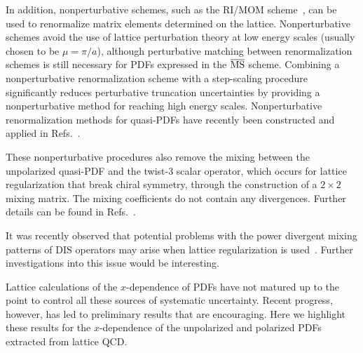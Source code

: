 \begin{itemize}
In addition, nonperturbative schemes, such as the 
RI/MOM scheme~\cite{Martinelli:1994ty}, 
can be used to renormalize matrix elements determined on the lattice. 
%
Nonperturbative schemes avoid the use of lattice perturbation theory at 
low energy scales (usually chosen to be $\mu = \pi/a$), although perturbative 
matching between renormalization schemes is still necessary for PDFs expressed 
in the $\overline{\rm MS}$ scheme. 
%
Combining a nonperturbative renormalization scheme with a step-scaling 
procedure~\cite{Luscher:1991wu} significantly reduces perturbative truncation 
uncertainties by providing a nonperturbative method for reaching high energy 
scales.
% 
Nonperturbative renormalization methods for quasi-PDFs have recently been 
constructed and applied in 
Refs.~\cite{Alexandrou:2017huk,Chen:2017mzz,Green:2017xeu}.

These nonperturbative procedures also remove the mixing between the unpolarized 
quasi-PDF and the twist-3 scalar operator, which occurs for lattice 
regularization that break chiral symmetry, through the construction 
of a $2\times2$ mixing matrix. 
%
The mixing coefficients do not contain any divergences. 
%
Further details can be found in Refs.~\cite{Alexandrou:2017huk,Chen:2017mzz}. 

It was recently observed that potential problems with the power divergent 
mixing patterns of DIS operators may arise when lattice regularization
is used~\cite{Rossi:2017muf}.
%
Further investigations into this issue would be interesting.

\end{itemize}

Lattice calculations of the $x$-dependence of PDFs have not matured 
up to the point to control all these sources of systematic uncertainty.       
%
Recent progress, however, has led to preliminary results that are encouraging. 
%
Here we highlight these results for the $x$-dependence
of the unpolarized and polarized PDFs extracted from lattice QCD. 

